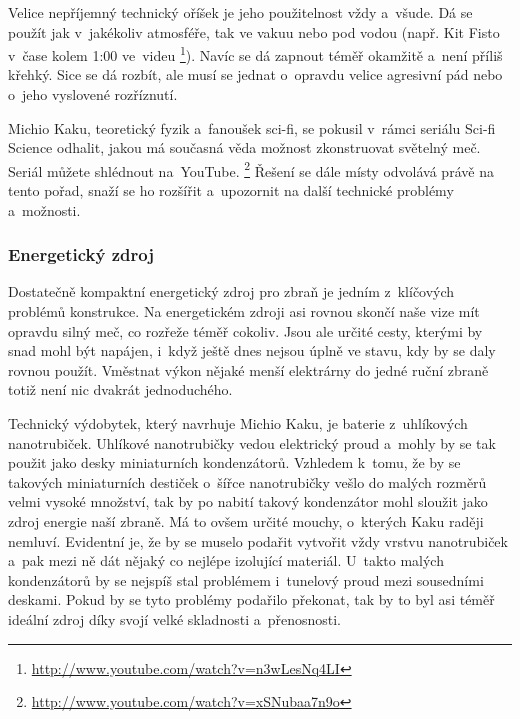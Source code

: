 {Velice nepříjemný technický oříšek je jeho použitelnost vždy a~všude. Dá se 
použít jak v~jakékoliv atmosféře, tak ve vakuu nebo pod vodou (např. Kit Fisto 
v~čase kolem 1:00 ve~videu%
\footnote{\url{http://www.youtube.com/watch?v=n3wLesNq4LI}}).
Navíc se dá zapnout téměř okamžitě a~není příliš křehký. Sice se dá rozbít, ale
musí se jednat o~opravdu velice agresivní pád nebo o~jeho vyslovené rozříznutí.

Michio Kaku, teoretický fyzik a~fanoušek sci-fi, se pokusil v~rámci seriálu
Sci-fi Science odhalit, jakou má současná věda možnost zkonstruovat světelný meč.
Seriál můžete shlédnout na~YouTube.%
\footnote{\url{http://www.youtube.com/watch?v=xSNubaa7n9o}}
Řešení se dále místy odvolává právě na tento pořad, snaží se ho rozšířit 
a~upozornit na další technické problémy a~možnosti.

\subsubsection{Energetický zdroj}
Dostatečně kompaktní energetický zdroj pro zbraň je jedním z~klíčových problémů 
konstrukce. Na energetickém zdroji asi rovnou skončí naše vize mít opravdu
silný meč, co rozřeže téměř cokoliv. Jsou ale určité cesty, kterými by snad 
mohl být napájen, i~když ještě dnes nejsou úplně ve stavu, kdy by se daly rovnou
použít. Vměstnat výkon nějaké menší elektrárny do jedné ruční zbraně totiž není
nic dvakrát jednoduchého.

Technický výdobytek, který navrhuje Michio Kaku, je baterie z~uhlíkových nanotrubiček. 
Uhlíkové nanotrubičky vedou elektrický proud a~mohly by se tak použit jako 
desky miniaturních kondenzátorů. Vzhledem k~tomu, že by se takových miniaturních 
destiček o~šířce nanotrubičky vešlo do malých rozměrů velmi vysoké množství,
tak by po nabití takový kondenzátor mohl sloužit jako zdroj energie naší zbraně.
Má to ovšem určité mouchy, o~kterých Kaku raději nemluví. Evidentní je, že by
se muselo podařit vytvořit vždy vrstvu nanotrubiček a~pak mezi ně dát
nějaký co nejlépe izolující materiál. U~takto malých kondenzátorů by se nejspíš 
stal problémem i~tunelový proud mezi sousedními deskami. Pokud by se tyto
problémy podařilo překonat, tak by to byl asi téměř ideální zdroj díky svojí
velké skladnosti a~přenosnosti.

}
